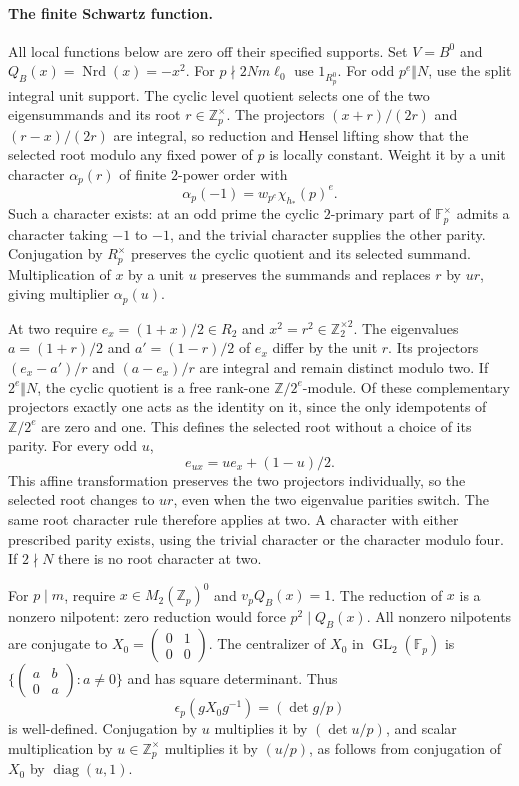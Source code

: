 \paragraph{The finite Schwartz function.}
All local functions below are zero off their specified supports.
Set $V=B^0$ and $Q_B(x)=\operatorname{Nrd}(x)=-x^2$.
For $p\nmid2Nm\ell_0$ use $1_{R_p^0}$.
For odd $p^e\Vert N$, use the split integral unit support.  The
cyclic level quotient selects one of the two eigensummands and its
root $r\in\mathbb Z_p^\times$.  The projectors
$(x+r)/(2r)$ and $(r-x)/(2r)$ are integral, so reduction and Hensel
lifting show that the selected root modulo any fixed power of $p$
is locally constant.  Weight it by a unit character $\alpha_p(r)$
of finite $2$-power order with
\[
 \alpha_p(-1)=w_{p^e}\chi_{h_*}(p)^e. \tag{O.3}
\]
Such a character exists: at an odd prime the cyclic $2$-primary
part of $\mathbb F_p^\times$ admits a character taking $-1$ to
$-1$, and the trivial character supplies the other parity.
Conjugation by $R_p^\times$ preserves the cyclic quotient and its
selected summand.  Multiplication of $x$ by a unit $u$ preserves
the summands and replaces $r$ by $ur$, giving multiplier
$\alpha_p(u)$.

At two require $e_x=(1+x)/2\in R_2$ and
$x^2=r^2\in\mathbb Z_2^{\times2}$.  The eigenvalues
$a=(1+r)/2$ and $a'=(1-r)/2$ of $e_x$ differ by the unit $r$.
Its projectors $(e_x-a')/r$ and $(a-e_x)/r$ are integral and remain
distinct modulo two.  If $2^e\Vert N$, the cyclic quotient is a
free rank-one $\mathbb Z/2^e$-module.  Of these complementary
projectors exactly one acts as the identity on it, since the only
idempotents of $\mathbb Z/2^e$ are zero and one.  This defines the
selected root without a choice of its parity.  For every odd $u$,
\[
 e_{ux}=u e_x+(1-u)/2.
\]
This affine transformation preserves the two projectors
individually, so the selected root changes to $ur$, even when
the two eigenvalue parities switch.  The same root character rule
therefore applies at two.  A character with either prescribed
parity exists, using the trivial character or the character modulo
four.  If $2\nmid N$ there is no root character at two.

For $p\mid m$, require $x\in M_2(\mathbb Z_p)^0$ and $v_pQ_B(x)=1$.
The reduction of $x$ is a nonzero nilpotent: zero reduction would
force $p^2\mid Q_B(x)$.  All nonzero nilpotents are conjugate to
$X_0=\left(\begin{smallmatrix}0&1\\0&0\end{smallmatrix}\right)$.
The centralizer of $X_0$ in $\operatorname{GL}_2(\mathbb F_p)$ is
$\{\left(\begin{smallmatrix}a&b\\0&a\end{smallmatrix}\right):a\ne0\}$
and has square determinant.  Thus
\[
 \epsilon_p(gX_0g^{-1})=(\det g/p)
\]
is well-defined.  Conjugation by $u$ multiplies it by $(\det u/p)$,
and scalar multiplication by $u\in\mathbb Z_p^\times$ multiplies
it by $(u/p)$, as follows from conjugation of $X_0$ by
$\operatorname{diag}(u,1)$.

